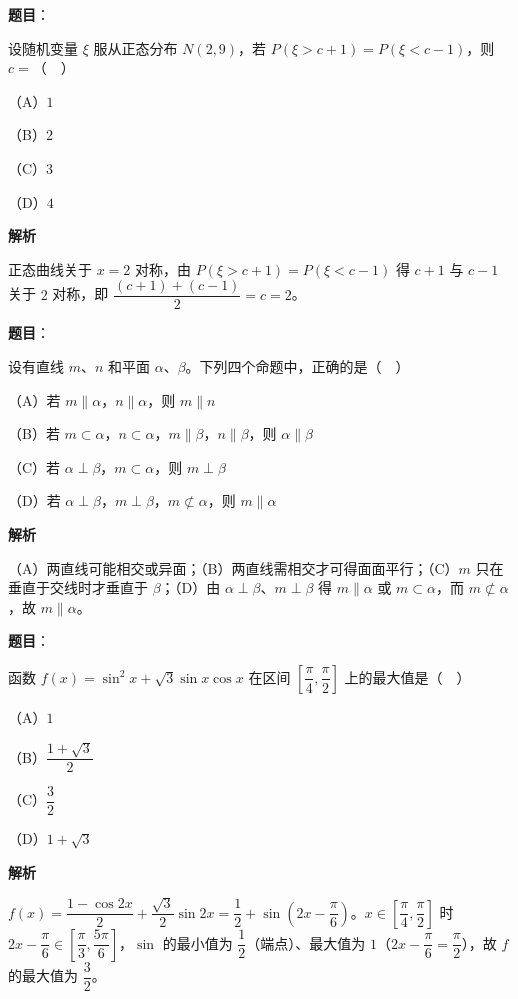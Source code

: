 \begin{answer}

\textbf{题目}：

设随机变量 $\xi$ 服从正态分布 $N(2,9)$，若 $P(\xi>c+1)=P(\xi<c-1)$，则 $c=$（　）

（A）$1$

（B）$2$

（C）$3$

（D）$4$

\textbf{解析}

正态曲线关于 $x=2$ 对称，由 $P(\xi>c+1)=P(\xi<c-1)$ 得 $c+1$ 与 $c-1$ 关于 $2$ 对称，即 $\dfrac{(c+1)+(c-1)}2=c=2$。


\end{answer}
\begin{answer}

\textbf{题目}：

设有直线 $m$、$n$ 和平面 $\alpha$、$\beta$。下列四个命题中，正确的是（　）

（A）若 $m\parallel\alpha$，$n\parallel\alpha$，则 $m\parallel n$

（B）若 $m\subset\alpha$，$n\subset\alpha$，$m\parallel\beta$，$n\parallel\beta$，则 $\alpha\parallel\beta$

（C）若 $\alpha\perp\beta$，$m\subset\alpha$，则 $m\perp\beta$

（D）若 $\alpha\perp\beta$，$m\perp\beta$，$m\not\subset\alpha$，则 $m\parallel\alpha$

\textbf{解析}

（A）两直线可能相交或异面；（B）两直线需相交才可得面面平行；（C）$m$ 只在垂直于交线时才垂直于 $\beta$；（D）由 $\alpha\perp\beta$、$m\perp\beta$ 得 $m\parallel\alpha$ 或 $m\subset\alpha$，而 $m\not\subset\alpha$，故 $m\parallel\alpha$。


\end{answer}
\begin{answer}

\textbf{题目}：

函数 $f(x)=\sin^2x+\sqrt3\sin x\cos x$ 在区间 $\left[\dfrac\pi4,\dfrac\pi2\right]$ 上的最大值是（　）

（A）$1$

（B）$\dfrac{1+\sqrt3}2$

（C）$\dfrac32$

（D）$1+\sqrt3$

\textbf{解析}

$f(x)=\dfrac{1-\cos2x}2+\dfrac{\sqrt3}2\sin2x=\dfrac12+\sin\left(2x-\dfrac\pi6\right)$。$x\in\left[\dfrac\pi4,\dfrac\pi2\right]$ 时 $2x-\dfrac\pi6\in\left[\dfrac\pi3,\dfrac{5\pi}6\right]$，$\sin$ 的最小值为 $\dfrac12$（端点）、最大值为 $1$（$2x-\dfrac\pi6=\dfrac\pi2$），故 $f$ 的最大值为 $\dfrac32$。


\end{answer}
